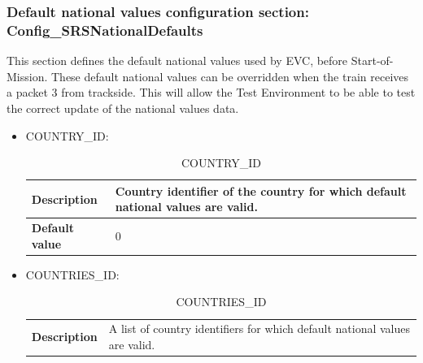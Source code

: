 \documentclass{template/openetcs}
\begin{document}
\subsubsection{Default national values configuration section: Config\_SRSNationalDefaults}
	This section defines the default national values used by EVC, before Start-of-Mission. These default national values can be overridden when the train receives a packet 3 from trackside. This will allow the Test Environment to be able to test the correct update of the national values data.
	
	\begin{itemize}
		\item COUNTRY\_ID:
		
			\begin{longtable}{|l|l|}
				\caption{COUNTRY\_ID}\\ 
				\hline
				
					\begin{minipage}[t]{0.22\linewidth} \textbf{Description}	\end{minipage} 
				&	\begin{minipage}[t]{0.78\linewidth} Country identifier of the country for which default national values are valid. \end{minipage} \\
				
				\hline
				
					\begin{minipage}[t]{0.22\linewidth} \textbf{Default value}	\end{minipage} 
				&	\begin{minipage}[t]{0.78\linewidth} 0 \end{minipage} \\
				
				\hline
				
			\end{longtable}
			
		\item COUNTRIES\_ID:
		
			\begin{longtable}{|l|l|}
				\caption{COUNTRIES\_ID}\\ 
				\hline
				
					\begin{minipage}[t]{0.22\linewidth} \textbf{Description}	\end{minipage} 
				&	\begin{minipage}[t]{0.78\linewidth} A list of country identifiers for which default national values are valid. \end{minipage} \\
				

\end{longtable}
\end{itemize}
\end{document}

